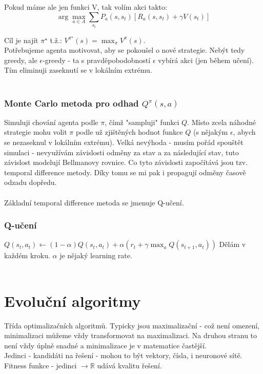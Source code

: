 \documentclass{article}
\begin{document}
Pokud máme ale jen funkci V, tak volím akci takto:\\
$$\arg\max_{a \in A} \sum_{s_{t}} P_{a}(s,s_{t})[R_{a}(s,s_{t}) + \gamma V(s_{t})]$$

Cíl je najít $\pi^{\star}$ t.ž.: $V^{\pi^{\star}}(s) = \max_{\pi} V^{\pi}(s)$.\\
Potřebujeme agenta motivovat, aby se pokoušel o nové strategie. Nebýt tedy greedy, ale $\epsilon$-greedy - ta s pravděpobodobností $\epsilon$
vybírá akci (jen během učení). Tím eliminuji zaseknutí se v lokálním extrému.\\\\

\subsubsection*{Monte Carlo metoda pro odhad $Q^{\pi}(s,a)$ }
Simuluji chování agenta podle $\pi$, čímž "sampluji" funkci $Q$. Místo zcela náhodné strategie mohu volit $\pi$ podle už zjištěných hodnot
funkce $Q$ (s nějakým $\epsilon$, abych se nezaseknul v lokálním extrému). Velká nevýhoda - musím pořád spouštět simulaci - nevyužívám
závislosti odměny za stav a za následující stav, tuto závislost modelují Bellmanovy rovnice. Co tyto závislosti započítává jsou tzv.
temporal difference metody. Díky tomu se mi pak i propagují odměny časově odzadu dopředu.\\\\

Základní temporal difference metoda se jmenuje Q-učení.\\
\subsubsection*{Q-učení}
$Q(s_{t},a_{t}) \leftarrow (1-\alpha)Q(s_{t},a_{t}) + \alpha(r_{t} + \gamma \max_{a}Q(s_{t+1},a_{t}))$
Dělám v každém kroku. $\alpha$ je nějaký learning rate.\\\\

\section{Evoluční algoritmy}
Třída optimalizačních algoritmů. Typicky jsou maximalizační - což není omezení, minimalizaci můžeme vždy
transformovat na maximalizaci. Na druhou stranu to není vždy úplně snadné a minimalizace je v matematice častější.\\
Jedinci - kandidáti na řešení - mohou to být vektory, čísla, i neuronové sítě.\\
Fitness funkce - jedinci $\rightarrow \mathbb{R}$ udává kvalitu řešení.\\\\
\end{document}
